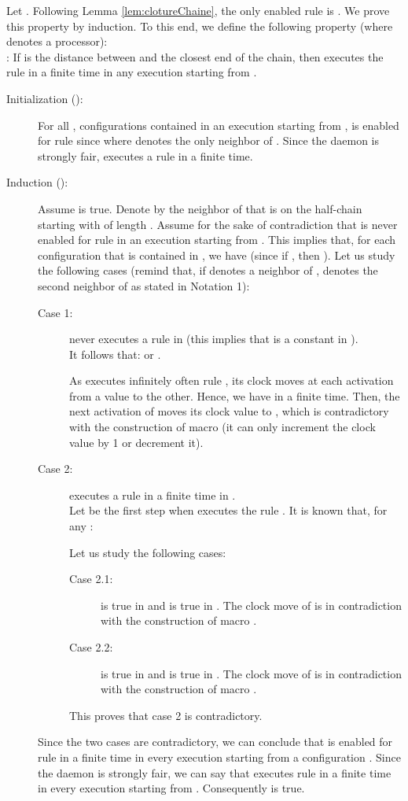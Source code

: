 \documentclass[11pt,english,letterpaper]{article}
\newenvironment{proof}{{\noindent\bf Proof. } }{{\hfill }}
\begin{document}
\begin{proof}
Let . Following Lemma \ref{lem:clotureChaine}, the only  enabled rule is . We prove this property by induction. To this end, we define the following property (where  denotes a processor):\\
 : If  is the distance between  and the closest end of the chain, then  executes the rule  in a finite time	in any execution starting from .

\begin{description}
\item[Initialization ():] For all , configurations contained in an execution starting from ,  is enabled for rule  since  where  denotes the only neighbor of .	Since the daemon is strongly fair,  executes a rule in a finite time.

\item[Induction ():] Assume  is true. Denote by  the neighbor of  that is on the half-chain starting with  of length . Assume for the sake of contradiction that  is never enabled for rule  in an execution  starting from . This implies that, for each configuration  that is contained in , we have  (since if , then ). Let us study the following cases (remind that, if  denotes a neighbor of ,  denotes the second neighbor of  as stated in Notation 1):

\begin{description}
\item[Case 1:]  never executes a rule in  (this implies that  is a constant in ).\\
It follows that:  or	.

As  executes infinitely often rule , its clock moves at each activation from a value to the other. Hence, we have  in a finite time. Then, the next activation of  moves its clock value to , which is contradictory with the construction of macro  (it can only increment the clock value by 1 or decrement it).

\item[Case 2:]  executes a rule in a finite time in .\\
Let  be the first step when  executes the rule . It is known that, for any :


Let us study the following cases:
\begin{description}
\item[Case 2.1:]  is true in  and  is true in .	The clock move of  is in contradiction with the construction of macro .

\item[Case 2.2:]  is true in  and  is true in .	The clock move of  is in contradiction with the construction of macro .
\end{description}

This proves that case 2 is contradictory.
\end{description}

Since the two cases are contradictory, we can conclude that  is enabled for rule  in a finite time in every execution starting from a configuration . Since the daemon is strongly fair, we can say that  executes rule  in a finite time in every execution starting from . Consequently  is true.
\end{description}
\end{proof}
\end{document}
